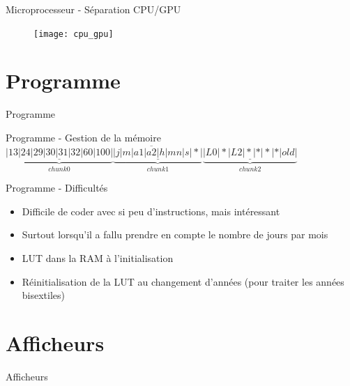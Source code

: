 \documentclass{beamer}
\begin{document}
\begin{frame}{Microprocesseur - Séparation CPU/GPU}
	\begin{figure}
		\centering
		\texttt{[image: cpu\_gpu]}
	\end{figure}
\end{frame}



\section{Programme}
\begin{frame}{Programme}
	
\end{frame}

\begin{frame}{Programme - Gestion de la mémoire}
	$\overline{\underbrace{\underline{|13|24|29|30|31|32|60|100|}}_{chunk 0}\underbrace{\underline{|j|m|a1|a2|h|mn|s|*|}}_{chunk 1}\underbrace{\underline{|L0|*|L2|*|*|*|*|old|}}_{chunk 2}}$
\end{frame}

\begin{frame}{Programme - Difficultés}
	\begin{itemize}
		\item Difficile de coder avec si peu d'instructions, mais intéressant
		\item Surtout lorsqu'il a fallu prendre en compte le nombre de jours par mois
		\item LUT dans la RAM à l'initialisation
		\item Réinitialisation de la LUT au changement d'années (pour traiter les années bisextiles)
	\end{itemize}
\end{frame}


\section{Afficheurs}
\begin{frame}{Afficheurs}
	
\end{frame}
\end{document}
